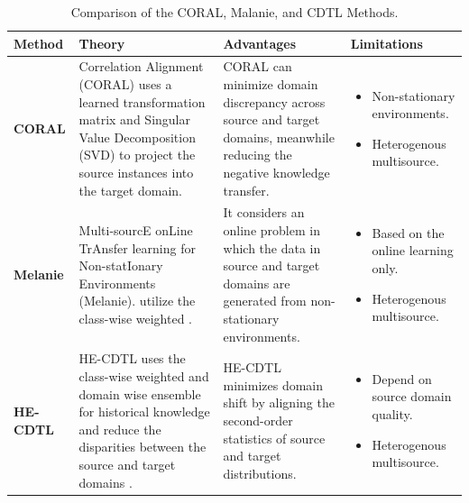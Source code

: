 \begin{table}[!ht]
    \centering
    \caption{Comparison of the CORAL, Malanie, and CDTL Methods.}
    \label{table:transfer}
    \small %
    \renewcommand{\arraystretch}{1} %
    \setlength{\tabcolsep}{4pt} %
    \setlength{\arrayrulewidth}{0.15mm}
    \begin{tabularx}{\textwidth}{|>{\centering\arraybackslash\bfseries}p{2cm}|
                                       >{\raggedright\arraybackslash}X|
                                       >{\raggedright\arraybackslash}X|
                                       >{\raggedright\arraybackslash}X|}
    \hline
    \textbf{Method} & \textbf{Theory} & \textbf{Advantages} & \textbf{Limitations} \\ 
    \hline
    \textbf{CORAL \cite{sun2016return}} & 
    Correlation Alignment (CORAL) uses a learned transformation matrix and Singular Value Decomposition (SVD)  to project the source instances into the target domain. & 
    CORAL can minimize domain discrepancy across
source and target domains, meanwhile reducing the negative
knowledge transfer. & 
    \begin{itemize}[leftmargin=*]
        \item Non-stationary environments.
        \item Heterogenous multisource.
    \end{itemize} \\ 
    \hline
    \textbf{Melanie \cite{dong2019multistream}} & 
    Multi-sourcE onLine TrAnsfer
learning for Non-statIonary Environments (Melanie). utilize the class-wise weighted . & 
It considers
an online problem in which the data in source and target
domains are generated from non-stationary environments. & 
    \begin{itemize}[leftmargin=*]
        \item Based on the online learning  only.
        \item Heterogenous multisource.
    \end{itemize} \\
    \hline
    \textbf{HE-CDTL \cite{sun2016return}} & 
    HE-CDTL uses the class-wise weighted and domain wise ensemble for historical knowledge and reduce the disparities between the source and target domains . & 
    HE-CDTL minimizes domain shift by aligning the second-order statistics of source and target distributions. & 
    \begin{itemize}[leftmargin=*]
        \item Depend on source domain quality.
        \item Heterogenous multisource.
    \end{itemize} \\
    \hline
    \end{tabularx}
    \end{table}
